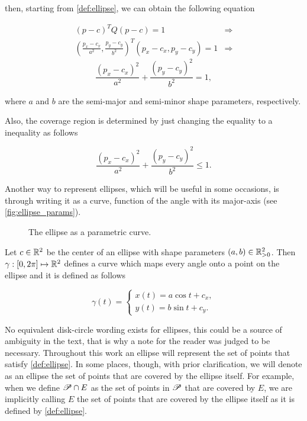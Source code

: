 \noindent then, starting from \autoref{def:ellipse}, we can obtain the following equation

\begin{align*}
        (p-c)^{T}Q(p-c) = 1 & \Rightarrow \\
    (\frac{p_x-c_x}{a^2}, \frac{p_y-c_y}{b^2})^{T}(p_x-c_x, p_y-c_y) = 1 & \Rightarrow
 \end{align*}
 \begin{equation}\label{equation:pellipse}
  \frac{(p_x-c_x)^2}{a^2} + \frac{(p_y-c_y)^2}{b^2} = 1,
 \end{equation}

\noindent where $a$ and $b$ are the semi-major and semi-minor shape parameters, respectively.

Also, the coverage region is determined by just changing the equality to a inequality as follows

\begin{equation}\label{equation:cover_pellipse}
\frac{(p_x-c_x)^2}{a^2} + \frac{(p_y-c_y)^2}{b^2} \le 1.
\end{equation}

Another way to represent ellipses, which will be useful in some occasions, is through writing it as a curve, function of the angle with its major-axis (see \autoref{fig:ellipse_params}).

\begin{figure}[H]
    \centering
    
    \caption{The ellipse as a parametric curve.}
    
    \fautor
    \label{fig:ellipse_params}
\end{figure}

Let $c \in \mathbb{R}^2$ be the center of an ellipse with shape parameters $(a,b) \in \mathbb{R}^2_{>0}$. Then $\gamma : [0, 2\pi] \mapsto \mathbb{R}^2$ defines a curve which maps every angle onto a point on the ellipse and it is defined as follows

    \begin{equation}\label{eq:parametric_ellipse}
    \gamma(t) = \left\{
    \begin{array}{l}
    x(t)= a\cos{t} + c_x,\\
    y(t)=b\sin{t} + c_y.
    \end{array}
    \right.
    \end{equation}

No equivalent disk-circle wording exists for ellipses, this could be a source of ambiguity in the text, that is why a note for the reader was judged to be necessary. Throughout this work an ellipse will represent the set of points that satisfy \autoref{def:ellipse}. In some places, though, with prior clarification, we will denote as an ellipse the set of points that are covered by the ellipse itself. For example, when we define $\mathscr{P} \cap E$ as the set of points in $\mathscr{P}$ that are covered by $E$, we are implicitly calling $E$ the set of points that are covered by the ellipse itself as it is defined by \autoref{def:ellipse}.

